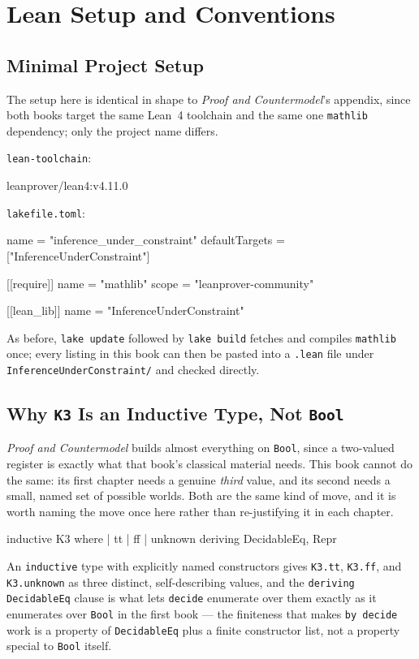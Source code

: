 \appendix
\chapter{Lean Setup and Conventions}
\label{app:lean-setup}

\section{Minimal Project Setup}

The setup here is identical in shape to \textit{Proof and
Countermodel}'s appendix, since both books target the same Lean~4
toolchain and the same one \texttt{mathlib} dependency; only the
project name differs.

\texttt{lean-toolchain}:
\begin{lean}
leanprover/lean4:v4.11.0
\end{lean}
\texttt{lakefile.toml}:
\begin{lean}
name = "inference_under_constraint"
defaultTargets = ["InferenceUnderConstraint"]

[[require]]
name = "mathlib"
scope = "leanprover-community"

[[lean_lib]]
name = "InferenceUnderConstraint"
\end{lean}
As before, \texttt{lake update} followed by \texttt{lake build}
fetches and compiles \texttt{mathlib} once; every listing in this
book can then be pasted into a \texttt{.lean} file under
\texttt{InferenceUnderConstraint/} and checked directly.

\section{Why \texttt{K3} Is an Inductive Type, Not \texttt{Bool}}

\textit{Proof and Countermodel} builds almost everything on
\texttt{Bool}, since a two-valued register is exactly what that
book's classical material needs. This book cannot do the same: its
first chapter needs a genuine \emph{third} value, and its second
needs a small, named set of possible worlds. Both are the same kind
of move, and it is worth naming the move once here rather than
re-justifying it in each chapter.

\begin{lean}
inductive K3 where
  | tt | ff | unknown
  deriving DecidableEq, Repr
\end{lean}
An \texttt{inductive} type with explicitly named constructors gives
\texttt{K3.tt}, \texttt{K3.ff}, and \texttt{K3.unknown} as three
distinct, self-describing values, and the \texttt{deriving
DecidableEq} clause is what lets \texttt{decide} enumerate over them
exactly as it enumerates over \texttt{Bool} in the first book — the
finiteness that makes \texttt{by decide} work is a property of
\texttt{DecidableEq} plus a finite constructor list, not a property
special to \texttt{Bool} itself.

